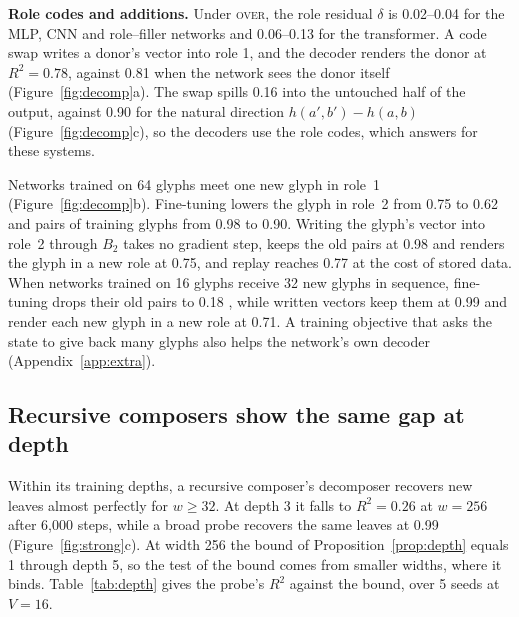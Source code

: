 \textbf{Role codes and additions.} Under \textsc{over}, the role residual $\delta$ is 0.02--0.04 for the MLP, CNN and role--filler networks and 0.06--0.13 for the transformer. A code swap writes a donor's vector into role 1, and the decoder renders the donor at $R^2 = 0.78$, against 0.81 when the network sees the donor itself (Figure~\ref{fig:decomp}a). The swap spills 0.16 into the untouched half of the output, against 0.90 for the natural direction $h(a', b') - h(a, b)$ (Figure~\ref{fig:decomp}c), so the decoders use the role codes, which answers \citet{fodor1990} for these systems.

Networks trained on 64 glyphs meet one new glyph in role~1 (Figure~\ref{fig:decomp}b). Fine-tuning lowers the glyph in role~2 from 0.75 to 0.62 and pairs of training glyphs from 0.98 to 0.90. Writing the glyph's vector into role~2 through $B_2$ takes no gradient step, keeps the old pairs at 0.98 and renders the glyph in a new role at 0.75, and replay reaches 0.77 at the cost of stored data. When networks trained on 16 glyphs receive 32 new glyphs in sequence, fine-tuning drops their old pairs to 0.18 \citep{mccloskey1989}, while written vectors keep them at 0.99 and render each new glyph in a new role at 0.71. A training objective that asks the state to give back many glyphs also helps the network's own decoder (Appendix~\ref{app:extra}).

\subsection{Recursive composers show the same gap at depth}
\label{app:depth}

Within its training depths, a recursive composer's decomposer recovers new leaves almost perfectly for $w \ge 32$. At depth 3 it falls to $R^2 = 0.26$ at $w = 256$ after 6{,}000 steps, while a broad probe recovers the same leaves at 0.99 (Figure~\ref{fig:strong}c). At width 256 the bound of Proposition~\ref{prop:depth} equals 1 through depth 5, so the test of the bound comes from smaller widths, where it binds. Table~\ref{tab:depth} gives the probe's $R^2$ against the bound, over 5 seeds at $V = 16$.

